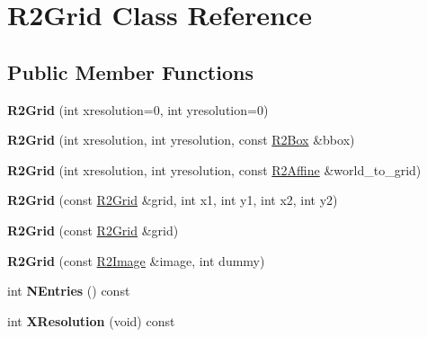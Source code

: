 \hypertarget{class_r2_grid}{}\section{R2\+Grid Class Reference}
\label{class_r2_grid}
\subsection*{Public Member Functions}
\begin{DoxyCompactItemize}
\item 
{\bfseries R2\+Grid} (int xresolution=0, int yresolution=0)\hypertarget{class_r2_grid_a85fb6c5bbe1604799d6a23570898a5d4}{}\label{class_r2_grid_a85fb6c5bbe1604799d6a23570898a5d4}

\item 
{\bfseries R2\+Grid} (int xresolution, int yresolution, const \hyperlink{class_r2_box}{R2\+Box} \&bbox)\hypertarget{class_r2_grid_ab1e4369e4b74b47008561b020ac50187}{}\label{class_r2_grid_ab1e4369e4b74b47008561b020ac50187}

\item 
{\bfseries R2\+Grid} (int xresolution, int yresolution, const \hyperlink{class_r2_affine}{R2\+Affine} \&world\+\_\+to\+\_\+grid)\hypertarget{class_r2_grid_a7debe5ee1a944d7787bacfd52eb0c315}{}\label{class_r2_grid_a7debe5ee1a944d7787bacfd52eb0c315}

\item 
{\bfseries R2\+Grid} (const \hyperlink{class_r2_grid}{R2\+Grid} \&grid, int x1, int y1, int x2, int y2)\hypertarget{class_r2_grid_aefd751d856695545534c1629a3593466}{}\label{class_r2_grid_aefd751d856695545534c1629a3593466}

\item 
{\bfseries R2\+Grid} (const \hyperlink{class_r2_grid}{R2\+Grid} \&grid)\hypertarget{class_r2_grid_afde2d4292d0dc538b5d5a3e019628caf}{}\label{class_r2_grid_afde2d4292d0dc538b5d5a3e019628caf}

\item 
{\bfseries R2\+Grid} (const \hyperlink{class_r2_image}{R2\+Image} \&image, int dummy)\hypertarget{class_r2_grid_a2af06c7359701028e9ce052797dce42a}{}\label{class_r2_grid_a2af06c7359701028e9ce052797dce42a}

\item 
int {\bfseries N\+Entries} () const \hypertarget{class_r2_grid_aef1211e455ff1a66fa2793e214b3a006}{}\label{class_r2_grid_aef1211e455ff1a66fa2793e214b3a006}

\item 
int {\bfseries X\+Resolution} (void) const \hypertarget{class_r2_grid_a38d8f734206ce7b29357c6e155a7e75b}{}\label{class_r2_grid_a38d8f734206ce7b29357c6e155a7e75b}


\end{DoxyCompactItemize}
